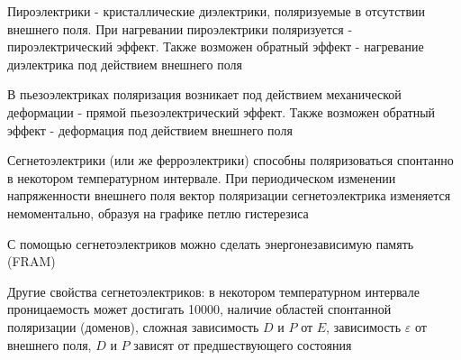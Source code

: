 Пироэлектрики - кристаллические диэлектрики, поляризуемые в отсутствии внешнего поля. При нагревании пироэлектрики поляризуется - пироэлектрический эффект.
Также возможен обратный эффект - нагревание диэлектрика под действием внешнего поля

\mediumvspace

В пьезоэлектриках поляризация возникает под действием механической деформации - прямой пьезоэлектрический эффект. Также 
возможен обратный эффект - деформация под действием внешнего поля

\mediumvspace

Сегнетоэлектрики (или же ферроэлектрики) способны поляризоваться спонтанно в некотором температурном интервале. 
При периодическом изменении напряженности внешнего поля вектор поляризации сегнетоэлектрика изменяется немоментально, 
образуя на графике петлю гистерезиса

С помощью сегнетоэлектриков можно сделать энергонезависимую память (FRAM)

Другие свойства сегнетоэлектриков: в некотором температурном интервале проницаемость может достигать 10000, наличие областей спонтанной поляризации (доменов), 
сложная зависимость $D$ и $P$ от $E$, зависимость $\varepsilon$ от внешнего поля, $D$ и $P$ зависят от предшествующего состояния
